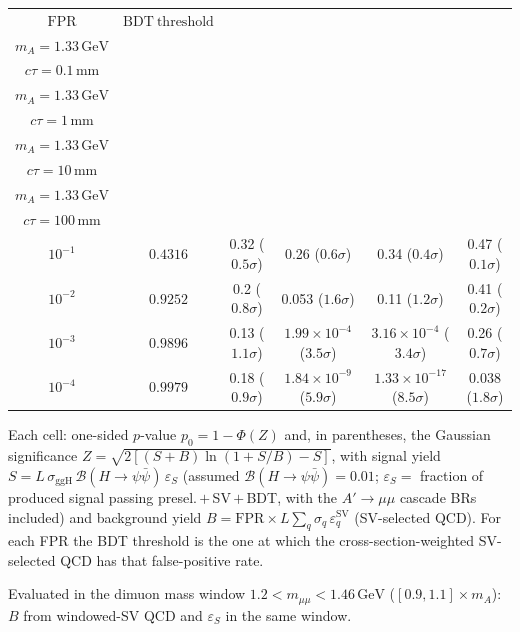 \documentclass[10pt,a4paper]{article}
\begin{document}
{\begin{tabular}{cccccc}
\toprule
$\mathrm{FPR}$ & $\mathrm{BDT\ threshold}$ & \shortstack{$m_{\pi}=4\,\mathrm{GeV}$\\$m_{A}=1.33\,\mathrm{GeV}$\\$c\tau=0.1\,\mathrm{mm}$} & \shortstack{$m_{\pi}=4\,\mathrm{GeV}$\\$m_{A}=1.33\,\mathrm{GeV}$\\$c\tau=1\,\mathrm{mm}$} & \shortstack{$m_{\pi}=4\,\mathrm{GeV}$\\$m_{A}=1.33\,\mathrm{GeV}$\\$c\tau=10\,\mathrm{mm}$} & \shortstack{$m_{\pi}=4\,\mathrm{GeV}$\\$m_{A}=1.33\,\mathrm{GeV}$\\$c\tau=100\,\mathrm{mm}$} \\
\midrule
$10^{-1}$ & $0.4316$ & 0.32 ($0.5\sigma$) & 0.26 ($0.6\sigma$) & 0.34 ($0.4\sigma$) & 0.47 ($0.1\sigma$)\\
$10^{-2}$ & $0.9252$ & 0.2 ($0.8\sigma$) & 0.053 ($1.6\sigma$) & 0.11 ($1.2\sigma$) & 0.41 ($0.2\sigma$)\\
$10^{-3}$ & $0.9896$ & 0.13 ($1.1\sigma$) & $1.99\times10^{-4}$ ($3.5\sigma$) & $3.16\times10^{-4}$ ($3.4\sigma$) & 0.26 ($0.7\sigma$)\\
$10^{-4}$ & $0.9979$ & 0.18 ($0.9\sigma$) & $1.84\times10^{-9}$ ($5.9\sigma$) & $1.33\times10^{-17}$ ($8.5\sigma$) & 0.038 ($1.8\sigma$)\\
\bottomrule
\end{tabular}

{\small Each cell: one-sided $p$-value $p_0=1-\Phi(Z)$ and, in parentheses, the Gaussian significance $Z=\sqrt{2\left[(S{+}B)\ln(1{+}S/B)-S\right]}$, with signal yield $S=L\,\sigma_{\mathrm{ggH}}\,\mathcal{B}(H\to\psi\bar{\psi})\,\varepsilon_S$ (assumed $\mathcal{B}(H\to\psi\bar{\psi})=0.01$; $\varepsilon_S=$ fraction of produced signal passing presel.\,$+$\,SV\,$+$\,BDT, with the $A'\to\mu\mu$ cascade BRs included) and background yield $B=\mathrm{FPR}\times L\sum_q\sigma_q\,\varepsilon_q^{\mathrm{SV}}$ (SV-selected QCD). For each FPR the BDT threshold is the one at which the cross-section-weighted SV-selected QCD has that false-positive rate.}

{\small Evaluated in the dimuon mass window $1.2<m_{\mu\mu}<1.46\,\mathrm{GeV}$ ($[0.9,1.1]\times m_A$): $B$ from windowed-SV QCD and $\varepsilon_S$ in the same window.}

}\clearpage
\end{document}
